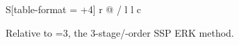 \begin{table}[h!]
\begin{center}
\begin{threeparttable}
\begin{tabular}{ S[table-format = +4] r @{ / } l l c }
  \bottomrule
\end{tabular}
\begin{tablenotes}
  \item[\ensuremath{\ast}]
  Relative to =3,
  the 3-stage/-order SSP ERK method.
\end{tablenotes}
\end{threeparttable}
\end{center}
\end{table}


